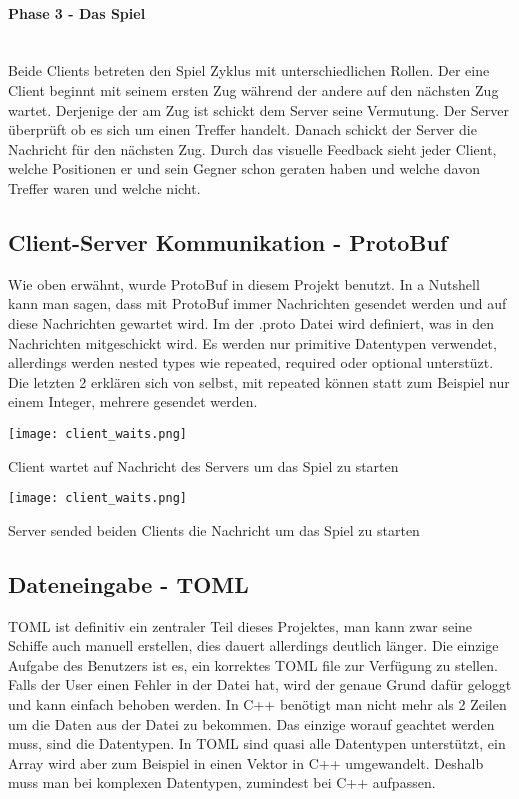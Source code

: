 \documentclass{article}
\begin{document}
\begin{flushleft}
\paragraph{Phase 3 - Das Spiel}\mbox{}\\
Beide Clients betreten den Spiel Zyklus mit unterschiedlichen Rollen. Der eine Client beginnt mit seinem ersten Zug während der andere auf den nächsten Zug wartet. Derjenige der am Zug ist schickt dem Server seine Vermutung. Der Server überprüft ob es sich um einen Treffer handelt. Danach schickt der Server die Nachricht für den nächsten Zug. Durch das visuelle Feedback sieht jeder Client, welche Positionen er und sein Gegner schon geraten haben und welche davon Treffer waren und welche nicht.

\subsection{Client-Server Kommunikation - ProtoBuf}
Wie oben erwähnt, wurde ProtoBuf in diesem Projekt benutzt. In a Nutshell kann man sagen, dass mit ProtoBuf immer Nachrichten gesendet werden und auf diese Nachrichten gewartet wird. Im der .proto Datei wird definiert, was in den Nachrichten mitgeschickt wird. Es werden nur primitive Datentypen verwendet, allerdings werden nested types wie repeated, required oder optional unterstüzt. Die letzten 2 erklären sich von selbst, mit repeated können statt zum Beispiel nur einem Integer, mehrere gesendet werden. 

 \end{flushleft}
\centering
\texttt{[image: client\_waits.png]}
\caption{Client wartet auf Nachricht des Servers um das Spiel zu starten}

\centering
\texttt{[image: client\_waits.png]}
\caption{Server sended beiden Clients die Nachricht um das Spiel zu starten}

 \begin{flushleft}
 
\subsection{Dateneingabe - TOML}
TOML ist definitiv ein zentraler Teil dieses Projektes, man kann zwar seine Schiffe auch manuell erstellen, dies dauert allerdings deutlich länger. Die einzige Aufgabe des Benutzers ist es, ein korrektes TOML file zur Verfügung zu stellen. Falls der User einen Fehler in der Datei hat, wird der genaue Grund dafür geloggt und kann einfach behoben werden. In C++ benötigt man nicht mehr als 2 Zeilen um die Daten aus der Datei zu bekommen. Das einzige worauf geachtet werden muss, sind die Datentypen. In TOML sind quasi alle Datentypen unterstützt, ein Array wird aber zum Beispiel in einen Vektor in C++ umgewandelt. Deshalb muss man bei komplexen Datentypen, zumindest bei C++ aufpassen.

 \end{flushleft}
 
\end{document}
